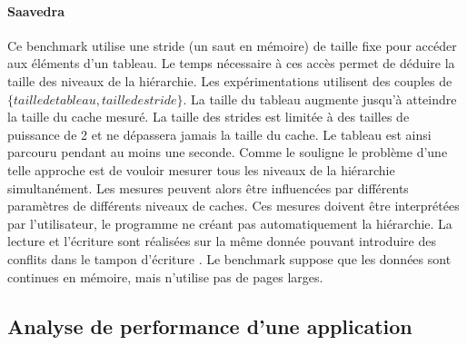         \paragraph{Saavedra \cite{Saavedra1995}} 
        
            Ce benchmark utilise une \gls{stride} (un saut en mémoire) de taille fixe pour accéder aux éléments d'un tableau. Le temps nécessaire à ces accès permet de déduire la taille des niveaux de la hiérarchie. Les expérimentations utilisent des couples de $\{taille de tableau, taille de stride\}$. La taille du tableau augmente jusqu'à atteindre la taille du cache mesuré. La taille des strides est limitée à des tailles de puissance de 2 et ne dépassera jamais la taille du cache. Le tableau est ainsi parcouru pendant au moins une seconde. Comme le souligne \cite{Yotov2005} le problème d'une telle approche est de vouloir mesurer tous les niveaux de la hiérarchie simultanément. Les mesures peuvent alors être influencées par différents paramètres de différents niveaux de caches. Ces mesures doivent être interprétées par l'utilisateur, le programme ne créant pas automatiquement la hiérarchie. La lecture et l'écriture sont réalisées sur la même donnée pouvant introduire des conflits dans le tampon d'écriture  \cite{Yotov2005}. Le benchmark suppose que les données sont continues en mémoire, mais n'utilise pas de pages larges.

       
\subsection{Analyse de performance d'une application}\label{sec:profiling}

